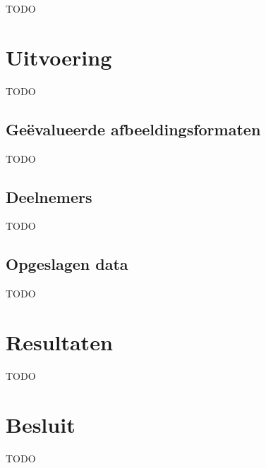 TODO


\section{Uitvoering}
\label{sec:onderzoek-uitvoering}

TODO

\subsection{Geëvalueerde afbeeldingsformaten}
\label{sec:onderzoek-uitvoering-afbeeldingsformaten}

TODO

\subsection{Deelnemers}
\label{sec:onderzoek-uitvoering-deelnemers}

TODO

\subsection{Opgeslagen data}
\label{sec:onderzoek-uitvoering-opgeslagen-data}

TODO

\section{Resultaten}
\label{sec:onderzoek-resultaten}

TODO

\section{Besluit}
\label{sec:onderzoek-besluit}

TODO
